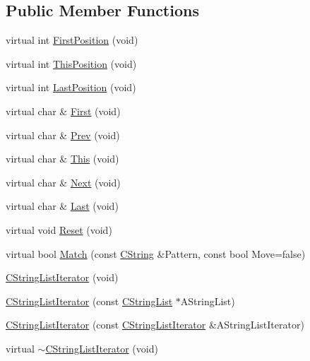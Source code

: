 \subsection*{Public Member Functions}
\begin{DoxyCompactItemize}
\item 
virtual int \hyperlink{classCStringListIterator_a0bde6983a18673bebfe0eed958231083}{First\-Position} (void)
\item 
virtual int \hyperlink{classCStringListIterator_a369446781e7b62abc79311f73bd9c54a}{This\-Position} (void)
\item 
virtual int \hyperlink{classCStringListIterator_afc5a0d463ea6783767dad416211318fc}{Last\-Position} (void)
\item 
virtual char \& \hyperlink{classCStringListIterator_aa127fde2929398c344504f500849fcb1}{First} (void)
\item 
virtual char \& \hyperlink{classCStringListIterator_a8b82110c52fedd6cb18660526c63f8ef}{Prev} (void)
\item 
virtual char \& \hyperlink{classCStringListIterator_ab163a0cda37b05ce985f876245bc8cd2}{This} (void)
\item 
virtual char \& \hyperlink{classCStringListIterator_aa4625f7dc1225aaae83f9154d44aec38}{Next} (void)
\item 
virtual char \& \hyperlink{classCStringListIterator_a2801731076eae0d85a8037aa746b0e3b}{Last} (void)
\item 
virtual void \hyperlink{classCStringListIterator_af3d67cf68505a00289ffd271215d1254}{Reset} (void)
\item 
virtual bool \hyperlink{classCStringListIterator_a42f9aed958e2d8217ac672e80b488f0a}{Match} (const \hyperlink{classCString}{C\-String} \&Pattern, const bool Move=false)
\item 
\hyperlink{classCStringListIterator_a784f10d3d80f27e00dea7ebe0e17672a}{C\-String\-List\-Iterator} (void)
\item 
\hyperlink{classCStringListIterator_acfe03967e4eeceed33f28ec4c01cc2f9}{C\-String\-List\-Iterator} (const \hyperlink{classCStringList}{C\-String\-List} $\ast$A\-String\-List)
\item 
\hyperlink{classCStringListIterator_ab2b2941f176109e6e026a129b5b472ad}{C\-String\-List\-Iterator} (const \hyperlink{classCStringListIterator}{C\-String\-List\-Iterator} \&A\-String\-List\-Iterator)
\item 
virtual \hyperlink{classCStringListIterator_a7101825fbd3350c03d2776f5d681251e}{$\sim$\-C\-String\-List\-Iterator} (void)
\end{DoxyCompactItemize}
